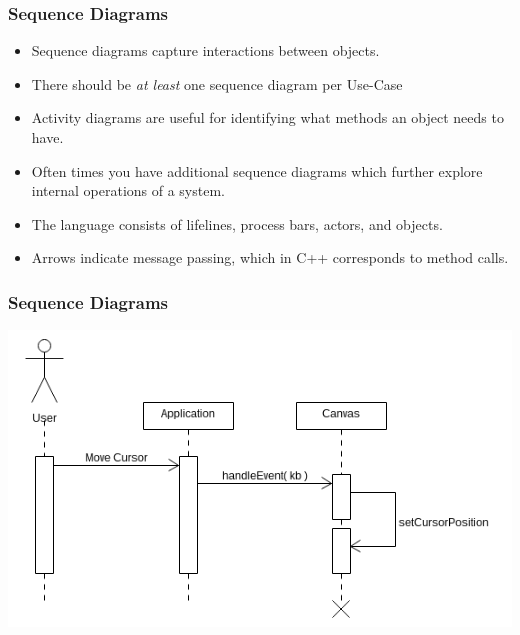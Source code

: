 \documentclass{beamer}
\begin{document}
\begin{frame}
    \frametitle{Sequence Diagrams}
    \begin{itemize}[<+->]
        \item Sequence diagrams capture interactions between objects.
        \item There should be {\em at least} one sequence diagram per 
            Use-Case
        \item Activity diagrams are useful for identifying what methods an
            object needs to have.
        \item Often times you have additional sequence diagrams which 
            further explore internal operations of a system.
        \item The language consists of lifelines, process bars, actors,
            and objects.  
        \item Arrows indicate message passing, which in C++ corresponds to
            method calls.
    \end{itemize}
\end{frame}

\begin{frame}
    \frametitle{Sequence Diagrams}
    \includegraphics[width=\textwidth]{images/shapesActivity}
\end{frame}
\end{document}
